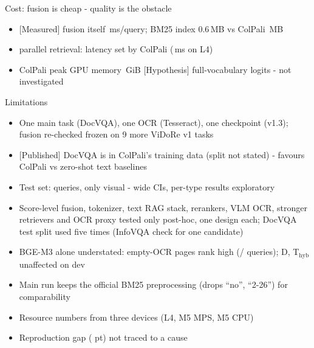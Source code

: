 \documentclass[aspectratio=169,11pt]{beamer}
\newcommand{\lbl}[2]{\textsf{\scriptsize\textcolor{#1}{[#2]}}}
\newcommand{\Pub}{\lbl{cpBlue}{Published}}
\newcommand{\Mea}{\lbl{bgAqua}{Measured}}
\newcommand{\Hyp}{\lbl{tagH}{Hypothesis}}
\begin{document}
\begin{frame}{Cost: fusion is cheap - quality is the obstacle}
\centering
{\scriptsize}
\vspace{0.2em}
\raggedright
\small
\begin{itemize}
  \item \Mea{} fusion itself \fusionOverhead{}\,ms/query; BM25 index 0.6\,MB vs ColPali \sizeB{}\,MB
  \item parallel retrieval: latency set by ColPali (\latB{}\,ms on L4)
  \item ColPali peak GPU memory \peakGPU{}\,GiB \Hyp{} full-vocabulary logits - not investigated
\end{itemize}
\end{frame}

\begin{frame}{Limitations}
\begin{itemize}
  \item One main task (DocVQA), one OCR (Tesseract), one checkpoint (v1.3); fusion re-checked frozen on 9 more ViDoRe v1 tasks
  \item \Pub{} DocVQA is in ColPali's training data (split not stated) - favours ColPali vs zero-shot text baselines
  \item Test set: \nTest{} queries, only \nvisual{} visual - wide CIs, per-type results exploratory
  \item Score-level fusion, tokenizer, text RAG stack, rerankers, VLM OCR, stronger retrievers and OCR proxy tested only post-hoc, one design each; DocVQA test split used five times (InfoVQA check for one candidate)
  \item BGE-M3 alone understated: empty-OCR pages rank high (\emptyTopFive{}/\nQueries{} queries); D, T$_\text{hyb}$ unaffected on dev
  \item Main run keeps the official BM25 preprocessing (drops ``no'', ``2-26'') for comparability
  \item Resource numbers from three devices (L4, M5 MPS, M5 CPU)
  \item Reproduction gap (\gapCardPts{} pt) not traced to a cause
\end{itemize}
\end{frame}
\end{document}
